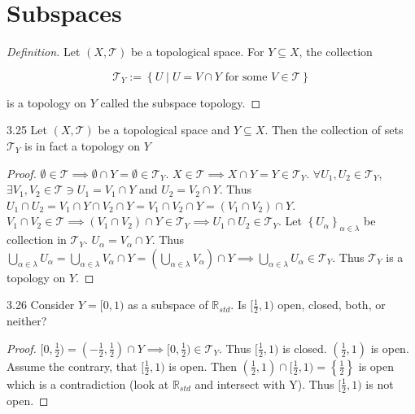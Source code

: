 \documentclass{article}
\newcommand*{\T}{\mathcal{T}}
\newcommand{\R}{\mathbb{R}}
\newenvironment{definition}
{\renewcommand\qedsymbol{$\blacksquare$}\begin{proof}[Definition]}
{\end{proof}}
\begin{document}
\pagebreak

\section*{Subspaces}

\begin{definition}
    Let $(X, \T)$ be a topological space. For $Y \subseteq X$, the collection
    
    \[\T_Y := \left\{ U \mid U = V \cap Y \text{ for some } V \in \T  \right\}\]

    is a topology on $Y$ called the subspace topology.  
\end{definition}

\bigskip

\begin{claim}{3.25}\label{Claim 3.25.}
    Let $(X, \T)$ be a topological space and $Y \subseteq X$. Then the collection of sets $\T_Y$ is in fact a topology on $Y$  
\end{claim}
\begin{proof}
    $\emptyset \in \T \implies \emptyset \cap Y = \emptyset \in \T_Y$. $X \in \T \implies X \cap Y = Y \in \T_Y$. $\forall U_1, U_2 \in \T_Y$, $\exists V_1, V_2 \in \T \ni U_1 = V_1 \cap Y$ and $U_2 = V_2 \cap Y$. Thus $U_1 \cap U_2 = V_1 \cap Y \cap V_2 \cap Y = V_1 \cap V_2 \cap Y = (V_1 \cap V_2) \cap Y$. $V_1 \cap V_2 \in \T \implies (V_1 \cap V_2) \cap Y \in \T_Y \implies U_1 \cap U_2 \in \T_Y$. Let $\left\{ U_\alpha \right\}_{\alpha \in \lambda}$ be collection in $\T_Y$. $U_\alpha = V_\alpha \cap Y$. Thus $\bigcup_{\alpha \in \lambda} U_\alpha = \bigcup_{\alpha \in \lambda} V_\alpha \cap Y = \left(\bigcup_{\alpha \in \lambda} V_\alpha\right)\cap Y \implies \bigcup_{\alpha \in \lambda} U_\alpha \in \T_Y$. Thus $\T_Y$ is a topology on $Y$.                
\end{proof}

\bigskip

\begin{PROB}{3.26}\label{Problem 3.26.}
    Consider $Y = [0, 1)$ as a subspace of $\R_{s td}$. Is $[\frac{1}{2}, 1)$ open, closed, both, or neither? 
\end{PROB}
\begin{proof}
    $[0, \frac{1}{2}) = (-\frac{1}{2}, \frac{1}{2}) \cap Y \implies [0, \frac{1}{2}) \in \T_Y$. Thus $[\frac{1}{2}, 1)$ is closed. $(\frac{1}{2}, 1)$ is open. Assume the contrary, that $[\frac{1}{2}, 1)$ is open. Then $(\frac{1}{2}, 1) \cap [\frac{1}{2}, 1) = \left\{ \frac{1}{2} \right\}$ is open which is a contradiction (look at $\R_{s td}$ and intersect with Y). Thus $[\frac{1}{2}, 1)$ is not open.           
\end{proof}
\end{document}
